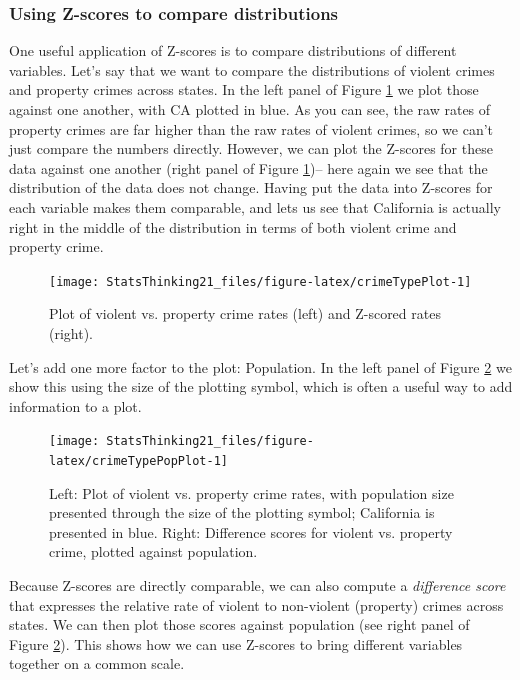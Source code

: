 \documentclass[
  12pt,
]{book}
\begin{document}
\hypertarget{using-z-scores-to-compare-distributions}{%
\subsubsection{Using Z-scores to compare distributions}\label{using-z-scores-to-compare-distributions}}

One useful application of Z-scores is to compare distributions of different variables. Let's say that we want to compare the distributions of violent crimes and property crimes across states. In the left panel of Figure \ref{fig:crimeTypePlot} we plot those against one another, with CA plotted in blue. As you can see, the raw rates of property crimes are far higher than the raw rates of violent crimes, so we can't just compare the numbers directly. However, we can plot the Z-scores for these data against one another (right panel of Figure \ref{fig:crimeTypePlot})-- here again we see that the distribution of the data does not change. Having put the data into Z-scores for each variable makes them comparable, and lets us see that California is actually right in the middle of the distribution in terms of both violent crime and property crime.

\begin{figure}
\texttt{[image: StatsThinking21\_files/figure-latex/crimeTypePlot-1]} \caption{Plot of violent vs. property crime rates (left) and Z-scored rates (right).}\label{fig:crimeTypePlot}
\end{figure}

Let's add one more factor to the plot: Population. In the left panel of Figure \ref{fig:crimeTypePopPlot} we show this using the size of the plotting symbol, which is often a useful way to add information to a plot.

\begin{figure}
\texttt{[image: StatsThinking21\_files/figure-latex/crimeTypePopPlot-1]} \caption{Left: Plot of violent vs. property crime rates, with population size presented through the size of the plotting symbol; California is presented in blue. Right: Difference scores for violent vs. property crime, plotted against population. }\label{fig:crimeTypePopPlot}
\end{figure}

Because Z-scores are directly comparable, we can also compute a \emph{difference score} that expresses the relative rate of violent to non-violent (property) crimes across states. We can then plot those scores against population (see right panel of Figure \ref{fig:crimeTypePopPlot}). This shows how we can use Z-scores to bring different variables together on a common scale.
\end{document}
